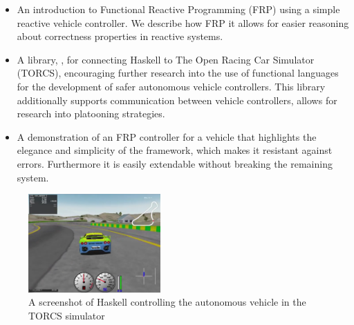 \begin{itemize}
\item An introduction to Functional Reactive Programming (FRP) using a simple reactive vehicle controller. We describe how FRP it allows for easier reasoning about correctness properties in reactive systems.

\item A library, \ourLib, for connecting Haskell to The Open Racing Car Simulator (TORCS), encouraging further research into the use of functional languages for the development of safer autonomous vehicle controllers. This library additionally supports communication between vehicle controllers, allows for research into platooning strategies.

\item A demonstration of an FRP controller for a vehicle that highlights the elegance and simplicity of the framework,
   which makes it resistant against errors. Furthermore it is easily extendable without breaking the remaining system.

\end{itemize}

\begin{figure}[t]
\includegraphics[width=0.45\textwidth]{figs/racing.png}
\caption{A screenshot of Haskell controlling the autonomous vehicle in the TORCS simulator}
\label{fig:race}
\end{figure}
